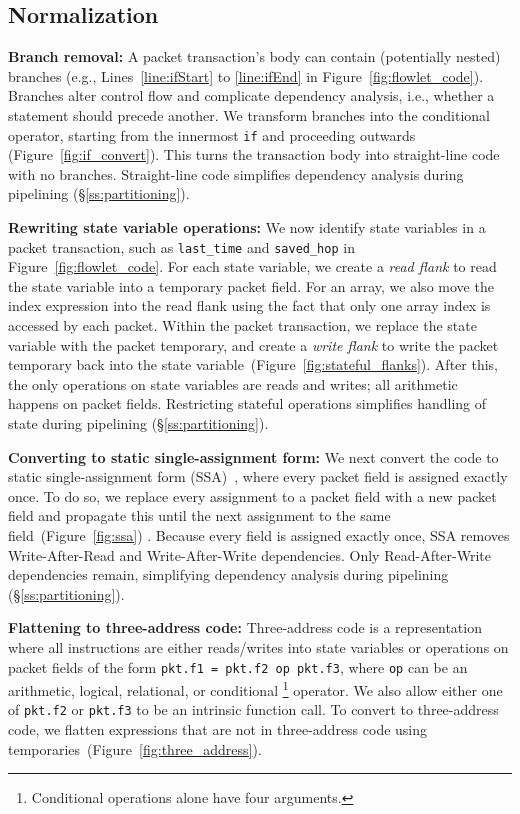 \subsection{Normalization}
\label{ss:normalization}

\textbf{Branch removal: }A packet transaction's body can contain (potentially
nested) branches (e.g., Lines~\ref{line:ifStart} to \ref{line:ifEnd} in
Figure~\ref{fig:flowlet_code}).  Branches alter control flow and complicate
dependency analysis, i.e.,  whether a statement should precede another.  We
transform branches into the conditional operator, starting from the innermost
\texttt{if} and proceeding outwards (Figure~\ref{fig:if_convert}).  This turns
the transaction body into straight-line code with no branches.  Straight-line
code simplifies dependency analysis during pipelining (\S\ref{ss:partitioning}).

\textbf{Rewriting state variable operations: }We now identify state variables
in a packet transaction, such as \texttt{last\_time} and \texttt{saved\_hop} in
Figure~\ref{fig:flowlet_code}.  For each state variable, we create a
\textit{read flank} to read the state variable into a temporary packet field.
For an array, we also move the index expression into the read flank using the
fact that only one array index is accessed by each packet.  Within the packet
transaction, we replace the state variable with the packet temporary, and
create a \textit{write flank} to write the packet temporary back into the state
variable~(Figure~\ref{fig:stateful_flanks}). After this, the only operations
on state variables are reads and writes; all arithmetic happens on packet
fields. Restricting stateful operations simplifies handling of state during
pipelining (\S\ref{ss:partitioning}).

\textbf{Converting to static single-assignment form: }We next convert the code to
static single-assignment form (SSA)~\cite{ssa}, where every packet field is
assigned exactly once. To do so, we replace every assignment to a packet field
with a new packet field and propagate this until the next assignment to the
same field~(Figure~\ref{fig:ssa}) .  Because every field is assigned exactly
once, SSA removes Write-After-Read and Write-After-Write dependencies.  Only
Read-After-Write dependencies remain, simplifying dependency analysis during
pipelining (\S\ref{ss:partitioning}).

\textbf{Flattening to three-address code: } Three-address code is a
representation where all instructions are either reads/writes into state
variables or operations on packet fields of the form \texttt{pkt.f1 = pkt.f2 op
pkt.f3}, where \texttt{op} can be an arithmetic, logical, relational, or conditional
\footnote{Conditional operations alone have four arguments.} operator.  We also allow either one of {\tt pkt.f2} or {\tt pkt.f3}
to be an intrinsic function call.  To convert to three-address code, we flatten
expressions that are not in three-address code using
temporaries~(Figure~\ref{fig:three_address}).

